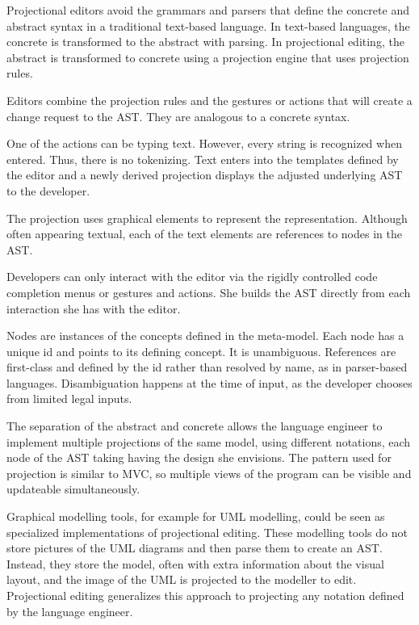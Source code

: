 Projectional editors avoid the grammars and parsers that define the concrete and abstract syntax in a traditional text-based language.
In text-based languages, the concrete is transformed to the abstract with parsing.
In projectional editing, the abstract is transformed to concrete using a projection engine that uses projection rules.

Editors combine the projection rules and the gestures or actions that will create a change request to the AST.
They are analogous to a concrete syntax.

One of the actions can be typing text. 
However, every string is recognized when entered.
Thus, there is no tokenizing.
Text enters into the templates defined by the editor and a newly derived projection displays the adjusted underlying AST to the developer.

The projection uses graphical elements to represent the representation.
Although often appearing textual, each of the text elements are references to nodes in the AST.

Developers can only interact with the editor via the rigidly controlled code completion menus or gestures and actions.
She builds the AST directly from each interaction she has with the editor.

Nodes are instances of the concepts defined in the meta-model.
Each node has a unique id and points to its defining concept.
It is unambiguous.
References are first-class and defined by the id rather than resolved by name, as in parser-based languages.
Disambiguation happens at the time of input, as the developer chooses from limited legal inputs.

The separation of the abstract and concrete allows the language engineer to implement multiple projections of the same model, using different notations, each node of the AST taking having the design she envisions.
The pattern used for projection is similar to MVC, so multiple views of the program can be visible and updateable simultaneously.

Graphical modelling tools, for example for UML modelling, could be seen as specialized implementations of projectional editing.
These modelling tools do not store pictures of the UML diagrams and then parse them to create an AST.
Instead, they store the model, often with extra information about the visual layout, and the image of the UML is projected to the modeller to edit.
Projectional editing generalizes this approach to projecting any notation defined by the language engineer.

